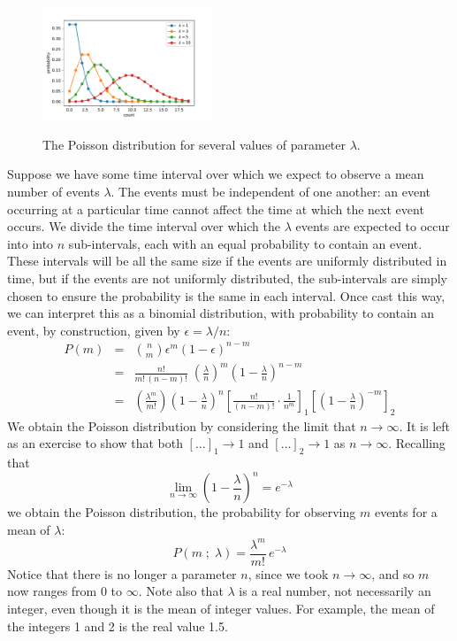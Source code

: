 \documentclass[12pt,oneside]{book}
\begin{document}
\begin{figure}[htbp]
\begin{center}
{\includegraphics[width=0.45\textwidth]{figs/poisson.pdf}}
\end{center}
\caption{\label{fig:poisson}  The Poisson distribution for several values of parameter $\lambda$.}
\end{figure}


Suppose we have some time interval over which we expect to observe a mean number of events $\lambda$.  The events must be independent of one another:  an event occurring at a particular time cannot affect the time at which the next event occurs.  We divide the time interval over which the $\lambda$ events are expected to occur into into $n$ sub-intervals, each with an equal probability to contain an event.  These intervals will be all the same size if the events are uniformly distributed in time, but if the events are not uniformly distributed, the sub-intervals are simply chosen to ensure the probability is the same in each interval.  Once cast this way, we can interpret this as a binomial distribution, with probability to contain an event, by construction, given by $\epsilon = \lambda / n$:
\begin{eqnarray*}
P(m) &=& \binom{n}{m} \epsilon^m (1-\epsilon)^{n-m} \\[5pt]
  &=& \frac{n!}{m! \, (n-m)!} \; \left( \frac{\lambda}{n} \right)^m \left( 1 - \frac{\lambda}{n}\right)^{n-m} \\[5pt]
  &=& \left( \frac{\lambda^m}{m!} \right) \left(1-\frac{\lambda}{n} \right)^n \left[ \frac{n!}{(n-m)!} \cdot \frac{1}{n^m}\right]_1 \left[ \left( 1 - \frac{\lambda}{n}\right)^{-m}\right]_2
\end{eqnarray*}
We obtain the Poisson distribution by considering the limit that  $n \to \infty$.   It is left as an exercise to show that both $[\dots]_1 \to 1$ and $[\dots]_2 \to 1$ as $n \to \infty$.  Recalling that
\begin{displaymath}
\lim_{n \to \infty} \left(1 - \frac{\lambda}{n} \right)^n = e^{-\lambda}
\end{displaymath}
we obtain the Poisson distribution, the probability for observing $m$ events for a mean of $\lambda$:
\begin{equation}
\label{eqn:poisson}
P(m\; ; \; \lambda) = \frac{\lambda^m}{m!} \, e^{-\lambda}
\end{equation}
Notice that there is no longer a parameter $n$, since we took $n \to \infty$, and so $m$ now ranges from 0 to $\infty$.  Note also that $\lambda$ is a real number, not necessarily an integer, even though it is the mean of integer values.  For example, the mean of the integers 1 and 2 is the real value 1.5.
\end{document}
